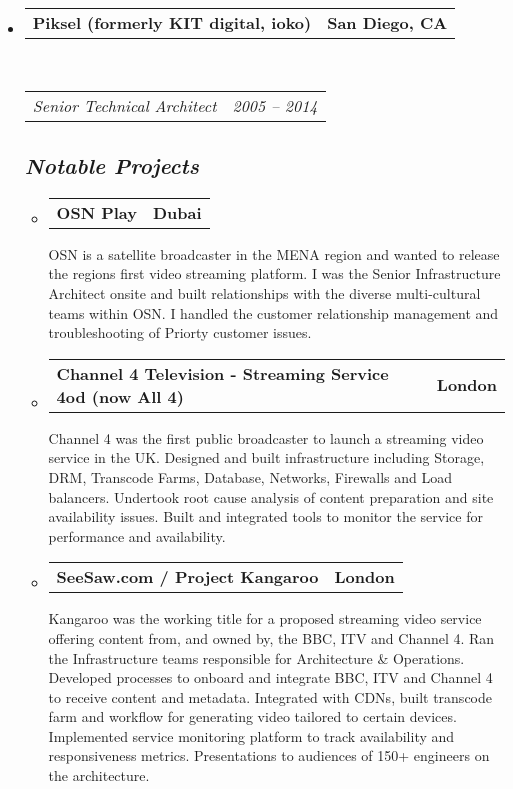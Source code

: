 \documentclass[10pt,a4paper]{article}
\makeatletter
\newcommand{\headerrow}[2]
{\begin{tabular*}{\linewidth}{l@{\extracolsep{\fill}}r}
	#1 &
	#2 \\
\end{tabular*}}
\makeatother
\begin{document}
\begin{itemize}
	\item
	\headerrow
		{\textbf{Piksel (formerly KIT digital, ioko)}}
		{\textbf{San Diego, CA}}
	\\
	\headerrow
		{\emph{Senior Technical Architect}}
		{\emph{2005 -- 2014}}
		\subsection*{\emph{Notable Projects}}
        \begin{itemize}
          \item
          \headerrow
              {\textbf{OSN Play}}
              {\textbf{Dubai}}
              OSN is a satellite broadcaster in the MENA region and wanted to release the regions first video streaming platform. I was the Senior Infrastructure Architect onsite and built relationships with the diverse multi-cultural teams within OSN.  I handled the customer relationship management and troubleshooting of Priorty customer issues.

					\item
          \headerrow
              {\textbf{Channel 4 Television - Streaming Service 4od (now All 4)}}
              {\textbf{London}}
              Channel 4 was the first public broadcaster to launch a streaming video service in the UK.  Designed and built infrastructure including Storage, DRM, Transcode Farms, Database, Networks, Firewalls and Load balancers. Undertook root cause analysis of content preparation and site availability issues.  Built and integrated tools to monitor the service for performance and availability.

					\item
          \headerrow
              {\textbf{SeeSaw.com / Project Kangaroo}}
              {\textbf{London}}
              Kangaroo was the working title for a proposed streaming video service offering content from, and owned by, the BBC, ITV and Channel 4. Ran the Infrastructure teams responsible for Architecture \& Operations. Developed processes to onboard and integrate BBC, ITV and Channel 4 to receive content and metadata. Integrated with CDNs, built transcode farm and workflow for generating video tailored to certain devices. Implemented service monitoring platform to track availability and responsiveness metrics.  Presentations to audiences of 150+ engineers on the architecture.


\end{itemize}
\end{itemize}
\end{document}
